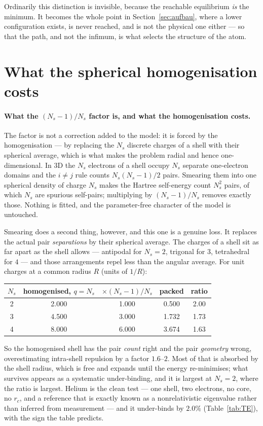 \documentclass[11pt]{article}
\begin{document}
Ordinarily this distinction is invisible, because the reachable equilibrium \emph{is} the
minimum. It becomes the whole point in Section~\ref{sec:aufbau}, where a lower configuration
exists, is never reached, and is not the physical one either --- so that the path, and not the
infimum, is what selects the structure of the atom.

\section{What the spherical homogenisation costs}\label{sec:radialsolver}

\paragraph{What the $(N_s{-}1)/N_s$ factor is, and what the homogenisation costs.}
The factor is not a correction added to the model: it is forced by the homogenisation --- by
replacing the $N_s$ discrete charges of a shell with their spherical average, which is what
makes the problem radial and hence one-dimensional. In
3D the $N_s$ electrons of a shell occupy $N_s$ separate one-electron domains and the
$i\neq j$ rule counts $N_s(N_s{-}1)/2$ pairs. Smearing them into one spherical density
of charge $N_s$ makes the Hartree self-energy count $N_s^2$ pairs, of which $N_s$ are
spurious self-pairs; multiplying by $(N_s{-}1)/N_s$ removes exactly those. Nothing is
fitted, and the parameter-free character of the model is untouched.

Smearing does a second thing, however, and this one is a genuine loss. It replaces the
actual pair \emph{separations} by their spherical average. The charges of a shell sit
as far apart as the shell allows --- antipodal for $N_s=2$, trigonal for $3$,
tetrahedral for $4$ --- and those arrangements repel less than the angular average. For
unit charges at a common radius $R$ (units of $1/R$):
\begin{center}\small
\begin{tabular}{ccccc}
\hline
$N_s$ & homogenised, $q=N_s$ & $\times(N_s{-}1)/N_s$ & packed & ratio \\
\hline
2 & 2.000 & 1.000 & 0.500 & 2.00 \\
3 & 4.500 & 3.000 & 1.732 & 1.73 \\
4 & 8.000 & 6.000 & 3.674 & 1.63 \\
\hline
\end{tabular}
\end{center}
So the homogenised shell has the pair \emph{count} right and the pair
\emph{geometry} wrong, overestimating intra-shell repulsion by a factor $1.6$--$2$. Most
of that is absorbed by the shell radius, which is free and expands until the energy
re-minimises; what survives appears as a systematic under-binding, and it is largest at
$N_s=2$, where the ratio is largest. Helium is the clean test --- one shell, two
electrons, no core, no $r_c$, and a reference that is exactly known as a nonrelativistic
eigenvalue rather than inferred from measurement --- and it under-binds by $2.0\%$
(Table~\ref{tab:TE}), with the sign the table predicts.
\end{document}
